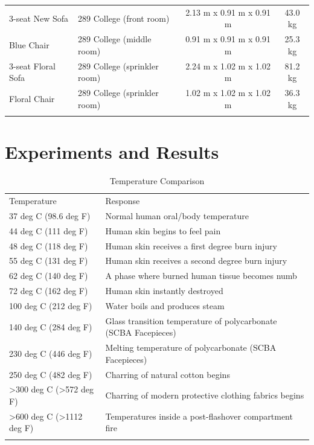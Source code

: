 \documentclass[12pt,oneside]{book}
\begin{document}
\begin{table}
\begin{tabular}{llcc}
		3-seat New Sofa              &  289 College (front room)         &  2.13 m x 0.91 m x 0.91 m  &  43.0 kg    \\
		Blue Chair                   &  289 College (middle room)        &  0.91 m x 0.91 m x 0.91 m  &  25.3 kg    \\
		3-seat Floral Sofa           &  289 College (sprinkler room)     &  2.24 m x 1.02 m x 1.02 m  &  81.2 kg    \\
		Floral Chair                 &  289 College (sprinkler room)     &  1.02 m x 1.02 m x 1.02 m  &  36.3 kg    \\
		\noalign{\smallskip}\hline
	\end{tabular}
	\label{tab:Fuel_Masses}
\end{table}

\chapter{Experiments and Results}
\label{chap:Experiments_and_Results}

\begin{table}
	\centering
	\caption{Temperature Comparison}
	\begin{tabular}{ll}
		\hline\noalign{\smallskip}
		Temperature				 & Response		\\
		\noalign{\smallskip}\hline\noalign{\smallskip}
		37 deg C (98.6 deg F)    &  Normal human oral/body temperature      \\
		44 deg C (111 deg F)   	 & Human skin begins to feel pain     \\
		48 deg C (118 deg F) 	 & Human skin receives a first degree burn injury      \\
		55 deg C (131 deg F)     & Human skin receives a second degree burn injury    \\
		62 deg C (140 deg F)     & A phase where burned human tissue becomes numb    \\
		72 deg C (162 deg F)     & Human skin instantly destroyed     \\
		100 deg C (212 deg F)    & Water boils and produces steam    \\
		140 deg C (284 deg F)    & Glass transition temperature of polycarbonate (SCBA Facepieces)      \\
		230 deg C (446 deg F)    & Melting temperature of polycarbonate (SCBA Facepieces)    \\
		250 deg C (482 deg F)    & Charring of natural cotton begins     \\
		>300 deg C (>572 deg F)  & Charring of modern protective clothing fabrics begins    \\
		>600 deg C (>1112 deg F) & Temperatures inside a post-flashover compartment fire     \\
		\noalign{\smallskip}\hline
	\end{tabular}
	\label{tab:Temperature_Comparison}
\end{table}
\end{document}
